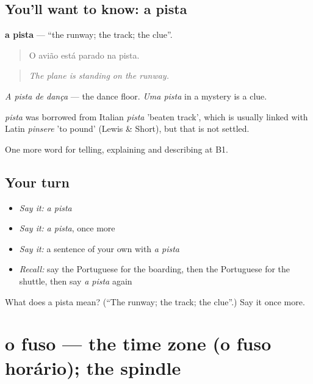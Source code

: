 \subsection*{You'll want to know: a pista}
\textbf{a pista} — \textquotedblleft{}the runway; the track; the clue\textquotedblright{}.

\begin{quote}
O avião está parado na pista.
\end{quote}

\begin{quote}
\emph{The plane is standing on the runway.}
\end{quote}

\emph{A pista de dança} — the dance floor. \emph{Uma pista} in a mystery is a clue.

\begin{cousinweb}
\emph{pista} was borrowed from Italian \emph{pista} 'beaten track', which is usually linked with Latin \emph{pinsere} 'to pound' (Lewis \& Short), but that is not settled.
\end{cousinweb}

\begin{grammarlens}[title={What you've built}]
One more word for telling, explaining and describing at B1.
\end{grammarlens}

\subsection*{Your turn}
\begin{itemize}
\raggedright
  \item \emph{Say it:} \emph{a pista}
  \item \emph{Say it:} \emph{a pista}, once more
  \item \emph{Say it:} a sentence of your own with \emph{a pista}
  \item \emph{Recall:} say the Portuguese for the boarding, then the Portuguese for the shuttle, then say \emph{a pista} again
\end{itemize}

\begin{tcolorbox}[breakable,colback=teal!4,colframe=teal!35!black,title={Before you move on}]
What does a pista mean? (\textquotedblleft{}The runway; the track; the clue\textquotedblright{}.) Say it once more.
\end{tcolorbox}
\section[o fuso]{o fuso — the time zone (o fuso horário); the spindle}

